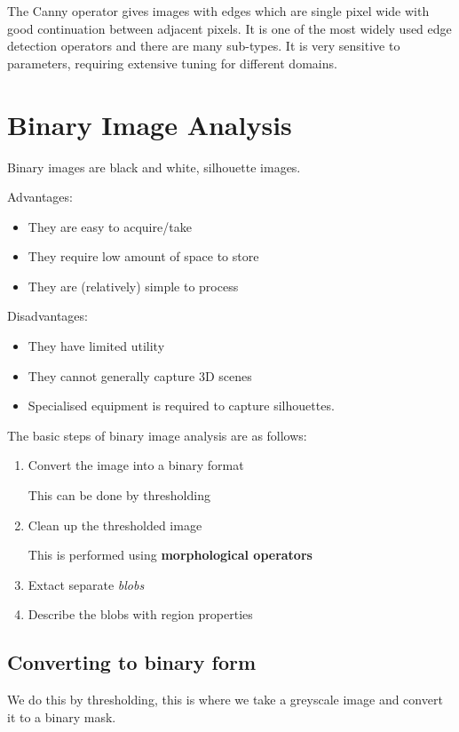 \documentclass{article}
\begin{document}
The Canny operator gives images with edges which are single pixel wide with good continuation between adjacent pixels. It is one of the most widely used edge detection operators and there are many sub-types. It is very sensitive to parameters, requiring extensive tuning for different domains.

\section{Binary Image Analysis}
Binary images are black and white, silhouette images.

Advantages:
\begin{itemize}
  \item They are easy to acquire/take
  \item They require low amount of space to store
  \item They are (relatively) simple to process
\end{itemize}

Disadvantages:
\begin{itemize}
  \item  They have limited utility
  \item They cannot generally capture 3D scenes
  \item Specialised equipment is required to capture silhouettes.
\end{itemize}

The basic steps of binary image analysis are as follows:

\begin{enumerate}
  \item Convert the image into a binary format\

        This can be done by thresholding
  \item Clean up the thresholded image

        This is performed using \textbf{morphological operators}
  \item Extact separate \textit{blobs}
  \item Describe the blobs with region properties
\end{enumerate}

\subsection{Converting to binary form}

We do this by thresholding, this is where we take a greyscale image and convert it to a binary mask.
\end{document}
